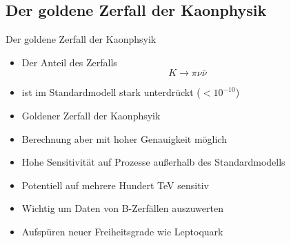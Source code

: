 \documentclass[aspectratio=1610, professionalfonts, 9pt, t]{beamer}
\begin{document}
  \subsection{Der goldene Zerfall der Kaonphysik}

  \begin{frame}{Der goldene Zerfall der Kaonphsyik}
    \begin{itemize}
      \item Der Anteil des Zerfalls
      \begin{equation*}
        K \rightarrow \pi \nu \bar{\nu}
      \end{equation*}
      \item[] ist im Standardmodell stark unterdrückt ($<10^{-10}$)
      \item[\rightarrow] Goldener Zerfall der Kaonphsyik
      \item Berechnung aber mit hoher Genauigkeit möglich
      \item[\rightarrow] Hohe Sensitivität auf Prozesse außerhalb des Standardmodells
      \item[\rightarrow] Potentiell auf mehrere Hundert TeV sensitiv
      \item Wichtig um Daten von B-Zerfällen auszuwerten
      \item[\rightarrow] Aufspüren neuer Freiheitsgrade wie Leptoquark %
    \end{itemize}
  \end{frame}
\end{document}
